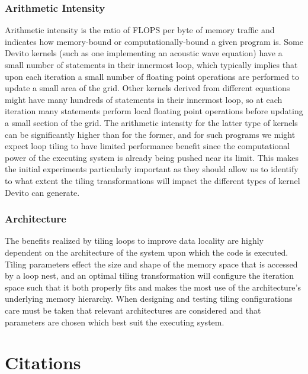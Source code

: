 \documentclass[a4paper,12pt,twoside]{report}
\begin{document}
\subsection{Arithmetic Intensity}
Arithmetic intensity is the ratio of FLOPS per byte of memory traffic and indicates how memory-bound or computationally-bound a given program is.
Some Devito kernels (such as one implementing an acoustic wave equation) have a small number of statements in their innermost loop, which typically
implies that upon each iteration a small number of floating point operations are performed to update a small area of the grid. Other kernels derived from different 
equations might have many hundreds of statements in their innermost loop, so at each iteration many statements perform local floating point operations before updating
a small section of the grid. The arithmetic intensity for the latter type of kernels can be significantly higher than for the former, and for such programs
we might expect loop tiling to have limited performance benefit since the computational power of the executing system is already being pushed near its limit. This makes
the initial experiments particularly important as they should allow us to identify to what extent the tiling transformations will impact the different types of kernel
Devito can generate.

\subsection{Architecture}
The benefits realized by tiling loops to improve data locality are highly dependent on the architecture of the system upon which the code is executed. Tiling parameters
effect the size and shape of the memory space that is accessed by a loop nest, and an optimal tiling transformation will configure the iteration space such that it both
properly fits and makes the most use of the architecture's underlying memory hierarchy. When designing and testing tiling configurations care must be taken that
relevant architectures are considered and that parameters are chosen which best suit the executing system.

\chapter{Citations}


\end{document}
